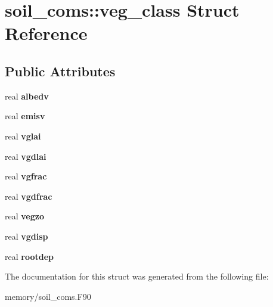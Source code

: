 \hypertarget{structsoil__coms_1_1veg__class}{
\section{soil\_\-coms::veg\_\-class Struct Reference}
\label{structsoil__coms_1_1veg__class}
}
\subsection*{Public Attributes}
\begin{DoxyCompactItemize}
\item 
\hypertarget{structsoil__coms_1_1veg__class_ad7e67d1eb454e0d615a370ef2b9154e7}{
real {\bfseries albedv}}
\label{structsoil__coms_1_1veg__class_ad7e67d1eb454e0d615a370ef2b9154e7}

\item 
\hypertarget{structsoil__coms_1_1veg__class_abc66ee046d6e2b81d0c4f4e1edbfc5f9}{
real {\bfseries emisv}}
\label{structsoil__coms_1_1veg__class_abc66ee046d6e2b81d0c4f4e1edbfc5f9}

\item 
\hypertarget{structsoil__coms_1_1veg__class_a58b0bcf4172f42506d04a7253716218d}{
real {\bfseries vglai}}
\label{structsoil__coms_1_1veg__class_a58b0bcf4172f42506d04a7253716218d}

\item 
\hypertarget{structsoil__coms_1_1veg__class_abb7597f50b6c8385af74302a006f8adc}{
real {\bfseries vgdlai}}
\label{structsoil__coms_1_1veg__class_abb7597f50b6c8385af74302a006f8adc}

\item 
\hypertarget{structsoil__coms_1_1veg__class_a9b7ae82034658e541d67b317ae16113b}{
real {\bfseries vgfrac}}
\label{structsoil__coms_1_1veg__class_a9b7ae82034658e541d67b317ae16113b}

\item 
\hypertarget{structsoil__coms_1_1veg__class_a5bd543b0f35ffaa5f96099166bbf7308}{
real {\bfseries vgdfrac}}
\label{structsoil__coms_1_1veg__class_a5bd543b0f35ffaa5f96099166bbf7308}

\item 
\hypertarget{structsoil__coms_1_1veg__class_a92986a414c313ee0032828d22b644a25}{
real {\bfseries vegzo}}
\label{structsoil__coms_1_1veg__class_a92986a414c313ee0032828d22b644a25}

\item 
\hypertarget{structsoil__coms_1_1veg__class_a203569a49361b89f526eaa821013b8b7}{
real {\bfseries vgdisp}}
\label{structsoil__coms_1_1veg__class_a203569a49361b89f526eaa821013b8b7}

\item 
\hypertarget{structsoil__coms_1_1veg__class_a3cc2625fcf60fc2d0822fd567837d355}{
real {\bfseries rootdep}}
\label{structsoil__coms_1_1veg__class_a3cc2625fcf60fc2d0822fd567837d355}

\end{DoxyCompactItemize}


The documentation for this struct was generated from the following file:\begin{DoxyCompactItemize}
\item 
memory/soil\_\-coms.F90\end{DoxyCompactItemize}
